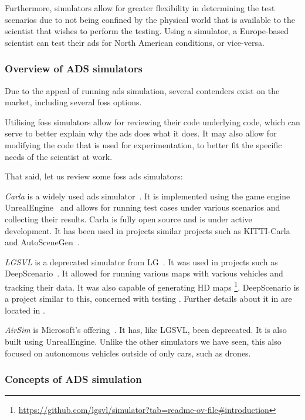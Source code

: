 Furthermore, simulators allow for greater flexibility in determining the test scenarios due to not
being confined by the  physical world that is available to the scientist that wishes to perform the
testing. Using a simulator, a Europe-based scientist can test their \acrshort{ads} for North
American conditions, or vice-versa.

\subsubsection{Overview of  ADS simulators}\label{sec:simulatorOverview}

Due to the appeal of running \acrshort{ads} simulation, several contenders exist
on the market, including several \acrfull{foss} options.

Utilising \acrshort{foss} simulators allow for reviewing their code underlying
code, which can serve to better explain why the \acrshort{ads} does what it
does. It may also allow for modifying the code that is used for experimentation,
to better fit the specific needs of the scientist at work.

That said, let us review some \acrshort{foss} \acrshort{ads} simulators:

\emph{Carla} is a widely used \acrshort{ads} simulator~\cite{Carla}. It is implemented
using the game engine UnrealEngine~\cite{unrealengine} and allows for running
test cases under various scenarios and collecting their results. Carla is fully
open source and is under active development. It has been used in projects
similar projects such as KITTI-Carla~\cite{kittiCarla} and AutoSceneGen~\cite{autoSceneGen}.

\emph{LGSVL} is a deprecated simulator from LG~\cite{lgsvl}. It was used in projects such
as DeepScenario~\cite{DeepScenario}. It allowed for running various maps with various vehicles and
tracking their data. It was also capable of generating HD
maps \footnote{\url{https://github.com/lgsvl/simulator?tab=readme-ov-file\#introduction}}.
DeepScenario is a project similar to this, concerned with testing . Further details
about it in are located in .

\emph{AirSim} is Microsoft's offering~\cite{airsim}. It has, like LGSVL,
been deprecated. It is also built using UnrealEngine. Unlike the other
simulators we have seen, this also focused on autonomous vehicles outside of
only cars, such as drones.


\subsubsection{Concepts of ADS simulation}\label{sec:adsSimConcepts}

